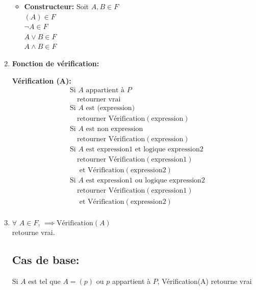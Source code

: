 \documentclass[16pt]{report}
\begin{document}
\begin{multicols*}{2}
\begin{enumerate}
\begin{itemize}
                \item \textbf{Constructeur:} Soit $A, B \in F$ \\
                $(A) \in F$ \\
                $\lnot A \in F$ \\
                $A \lor B \in F$ \\
                $A \land B \in F$
            \end{itemize}

            \item \textbf{Fonction de vérification:}

            \textbf{Vérification (A):}
            \begin{align*}
                &\text{Si } A \text{ appartient à } P \\
                &\quad \text{retourner vrai} \\
                &\text{Si } A \text{ est (expression)} \\
                &\quad \text{retourner } \text{Vérification}(\text{expression}) \\
                &\text{Si } A \text{ est non expression} \\
                &\quad \text{retourner } \text{Vérification}(\text{expression}) \\
                &\text{Si } A \text{ est expression1 et logique expression2} \\
                &\quad \text{retourner } \text{Vérification}(\text{expression1}) \\ & \quad \text{ et } 
                \text{Vérification}(\text{expression2}) \\
                &\text{Si } A \text{ est expression1 ou logique expression2} \\
                &\quad \text{retourner } \text{Vérification}(\text{expression1})  \\ & \quad \text{ et } 
                \text{Vérification}(\text{expression2}) \\
            \end{align*}
            \item
           $\forall$ \(A \in F\), \(\implies\text{Vérification}(A)\) \\ retourne vrai.
        \subsection*{Cas de base:}
        Si $A$ est tel que $A = (p)$ ou $p$ appartient à $P$, Vérification(A) retourne vrai


\end{enumerate}
\end{multicols*}
\end{document}
